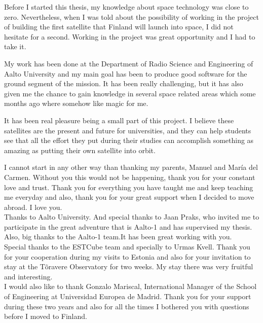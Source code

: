 
Before I started this thesis, my knowledge about space technology was close to zero. Nevertheless, when I was told about the possibility of working in the project of building the first satellite that Finland will launch into space, I did not hesitate for a second. Working in the project was great opportunity and I had to take it.

My work has been done at the Department of Radio Science and Engineering of Aalto University and my main goal has been to produce good software for the ground segment of the mission. It has been really challenging, but it has also given me the chance to gain knowledge in several space related areas which some months ago where somehow like magic for me.

It has been real pleasure being a small part of this project. I believe these satellites are the present and future for universities, and they can help students see that all the effort they put during their studies can accomplish something as amazing as putting their own satellite into orbit.


\thispagestyle{plain}
\pagebreak


I cannot start in any other way than thanking my parents, Manuel and María del Carmen. Without you this would not be happening, thank you for your constant love and trust. Thank you for everything you have taught me and keep teaching me everyday and also, thank you for your great support when I decided to move abroad. I love you.\\

Thanks to Aalto University. And special thanks to Jaan Praks, who invited me to participate in the great adventure that is Aalto-1 and has supervised my thesis. Also, big thanks to the Aalto-1 team.It has been great working with you.\\

Special thanks to the ESTCube team and specially to Urmas Kvell. Thank you for your cooperation during my visits to Estonia and also for your invitation to stay at the Tõravere Observatory for two weeks. My stay there was very fruitful  and interesting.\\

I would also like to thank Gonzalo Mariscal, International Manager of the School of Engineering at Universidad Europea de Madrid. Thank you for your support during these two years and also for all the times I bothered you with questions before I moved to Finland.\\

